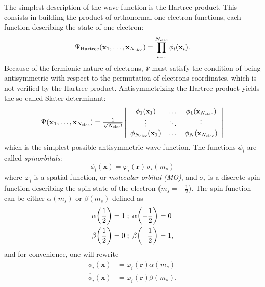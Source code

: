 \documentclass[./thesis.tex]{subfiles}
\begin{document}
The simplest description of the wave function is the Hartree product. This consists in 
building the product of orthonormal one-electron functions, each function describing the state of
one electron:
\begin{equation}
\Psi_{\text{Hartree}}({\bf x}_1,\dots,{\bf x}_{{N_\text{elec}}})  = \prod_{i=1}^{N_\text{elec}} \phi_i(\textbf{x}_i).
\end{equation}
Because of the fermionic nature of electrons, $\Psi$ must satisfy the condition of being antisymmetric with respect to the permutation of electrons coordinates, which is not verified by the Hartree product.
Antisymmetrizing the Hartree product yields the so-called Slater determinant:
\begin{equation}
\begin{array}{c}
 \Psi({\bf x}_1,\dots,{\bf x}_{{N_\text{elec}}}) = 
\frac{1}{\sqrt{{N_\text{elec}}}!} \left|
 \begin{array}{ccc}
 \phi_1({\bf x}_1) & \dots & \phi_1({\bf x}_{{N_\text{elec}}}) \\
 \vdots              & \ddots &   \vdots             \\
 \phi_{{N_\text{elec}}}({\bf x}_1) & \dots & \phi_N({\bf x}_{{N_\text{elec}}}) \\
 \end{array}
\right| \\ 
\end{array} 
\label{eq:slater1}
\end{equation}
which is the simplest possible antisymmetric wave function.
The functions $\phi_i$ are called \emph{spinorbitals}:
\begin{equation}
\phi_i(\textbf{x}) = \varphi_i(\textbf{r}) \, \sigma_i(m_s)
\end{equation}
where $\varphi_i$ is a spatial function, or \emph{molecular orbital (MO)}, and $\sigma_i$ is a
discrete spin function describing the spin state of the electron ($m_s = \pm \frac{1}{2}$). The spin
function can be either $\alpha(m_s)$ or $\beta(m_s)$ defined as
\begin{align}
\alpha \qty(\frac{1}{2}) = 1  \; &; \;  \alpha \qty(-\frac{1}{2}) = 0   \\ \nonumber
\beta  \qty(\frac{1}{2}) = 0  \; &; \;  \beta  \qty(-\frac{1}{2}) = 1,
\end{align}
and for convenience, one will rewrite
\begin{align}
\phi_i(\textbf{x}) & = \varphi_i(\mathbf{r}) \alpha(m_s) \\ \nonumber
\overline{\phi}_i(\textbf{x}) & = \varphi_i(\mathbf{r}) \beta(m_s).
\end{align}
\end{document}
